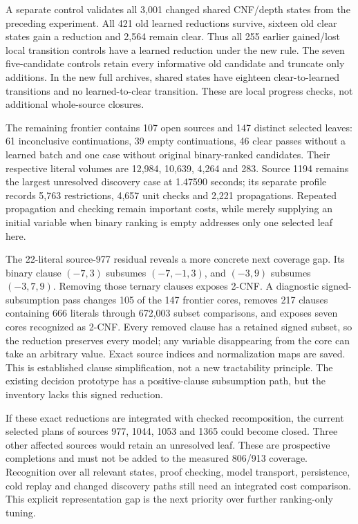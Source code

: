 \documentclass[11pt,a4paper]{article}
\numberwithin{equation}{section}
\theoremstyle{plain}
\theoremstyle{definition}
\theoremstyle{remark}
\begin{document}
A separate control validates all 3,001 changed shared CNF/depth states from the preceding experiment. All 421 old learned reductions survive, sixteen old clear states gain a reduction and 2,564 remain clear. Thus all 255 earlier gained/lost local transition controls have a learned reduction under the new rule. The seven five-candidate controls retain every informative old candidate and truncate only additions. In the new full archives, shared states have eighteen clear-to-learned transitions and no learned-to-clear transition. These are local progress checks, not additional whole-source closures.

The remaining frontier contains 107 open sources and 147 distinct selected leaves: 61 inconclusive continuations, 39 empty continuations, 46 clear passes without a learned batch and one case without original binary-ranked candidates. Their respective literal volumes are 12,984, 10,639, 4,264 and 283. Source 1194 remains the largest unresolved discovery case at 1.47590 seconds; its separate profile records 5,763 restrictions, 4,657 unit checks and 2,221 propagations. Repeated propagation and checking remain important costs, while merely supplying an initial variable when binary ranking is empty addresses only one selected leaf here.

The 22-literal source-977 residual reveals a more concrete next coverage gap. Its binary clause $(-7,3)$ subsumes $(-7,-1,3)$, and $(-3,9)$ subsumes $(-3,7,9)$. Removing those ternary clauses exposes 2-CNF. A diagnostic signed-subsumption pass changes 105 of the 147 frontier cores, removes 217 clauses containing 666 literals through 672,003 subset comparisons, and exposes seven cores recognized as 2-CNF. Every removed clause has a retained signed subset, so the reduction preserves every model; any variable disappearing from the core can take an arbitrary value. Exact source indices and normalization maps are saved. This is established clause simplification, not a new tractability principle. The existing decision prototype has a positive-clause subsumption path, but the inventory lacks this signed reduction.

If these exact reductions are integrated with checked recomposition, the current selected plans of sources 977, 1044, 1053 and 1365 could become closed. Three other affected sources would retain an unresolved leaf. These are prospective completions and must not be added to the measured 806/913 coverage. Recognition over all relevant states, proof checking, model transport, persistence, cold replay and changed discovery paths still need an integrated cost comparison. This explicit representation gap is the next priority over further ranking-only tuning.
\end{document}
